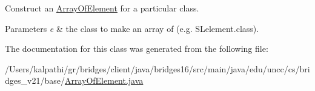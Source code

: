 Construct an \hyperlink{classbridges_1_1base_1_1_array_of_element}{Array\+Of\+Element} for a particular class. 
\begin{DoxyParams}{Parameters}
{\em e} & the class to make an array of (e.\+g. S\+Lelement.\+class). \\
\hline
\end{DoxyParams}


The documentation for this class was generated from the following file\+:\begin{DoxyCompactItemize}
\item 
/\+Users/kalpathi/gr/bridges/client/java/bridges16/src/main/java/edu/uncc/cs/bridges\+\_\+v21/base/\hyperlink{_array_of_element_8java}{Array\+Of\+Element.\+java}\end{DoxyCompactItemize}
